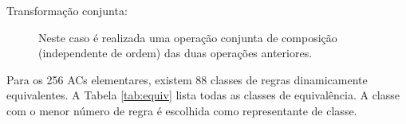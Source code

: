 \documentclass[12pt,a4paper]{article}
\begin{document}
\begin{description}
\newpage

\item[Transformação conjunta:] Neste caso é realizada uma operação
conjunta de composição (independente de ordem) das duas operações anteriores.

\end{description}

Para os 256 ACs elementares, existem 88 classes de regras dinamicamente equivalentes.
A Tabela \ref{tab:equiv} lista todas as classes de equivalência. A classe com o menor número
de regra é escolhida como representante de classe.

\begin{table}[H]
\begin{minipage}[b]{0.3\linewidth}\centering
{}
\end{minipage}
\end{table}
\end{document}
